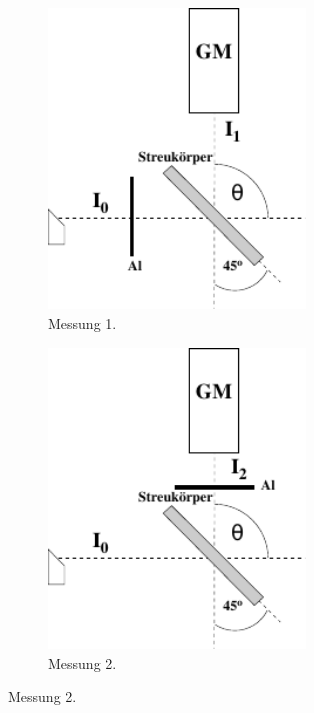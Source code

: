     \begin{figure}[H]
        \centering
        \begin{subfigure}{0.4\textwidth}
            \centering
            \includegraphics[width=0.75\textwidth]{content/img/Abb_3a.pdf}
            \caption{Messung 1. \cite{versuchsanleitung}}
            \label{fig:aufbau_transmission_a}
        \end{subfigure}
        \begin{subfigure}{0.4\textwidth}
            \centering
            \includegraphics[width=0.75\textwidth]{content/img/Abb_3b.pdf}
            \caption{Messung 2. \cite{versuchsanleitung}}
            \label{fig:aufbau_transmission_b}
        \end{subfigure}
    \end{figure}

